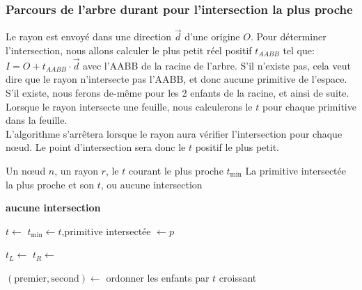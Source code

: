 \subsubsection{Parcours de l'arbre durant pour l'intersection la plus proche}

Le rayon est envoyé dans une direction $\vec{d}$ d'une origine $O$. Pour déterminer l'intersection, nous allons calculer le plus petit réel positif $t_{AABB}$ tel que: $I=O+t_{AABB}\cdot \vec d$ avec l'AABB de la racine de l'arbre. S'il n'existe pas, cela veut dire que le rayon n'intersecte pas l'AABB, et donc aucune primitive de l'espace. S'il existe, nous ferons de-même pour les 2 enfants de la racine, et ainsi de suite. Lorsque le rayon intersecte une feuille, nous calculerons le $t$ pour chaque primitive dans la feuille.\\

L'algorithme s'arrêtera lorsque le rayon aura vérifier l'intersection pour chaque n\oe ud. Le point d'intersection sera donc le $t$ positif le plus petit.\\

\begin{algorithm}
\caption{Intersection d'un rayon avec l'arbre BVH}
\begin{algorithmic}
\Require Un nœud $n$, un rayon $r$, le $t$ courant le plus proche $t_{\min}$
\Ensure La primitive intersectée la plus proche et son $t$, ou aucune intersection

    \State \Return \textbf{aucune intersection}
\EndIf

        \State $t \leftarrow$ 
            \State $t_{\min} \leftarrow t$,\quad primitive intersectée $\leftarrow p$
        \EndIf
    \EndFor
    \State \Return
\EndIf

\State $t_L \leftarrow$ 
\State $t_R \leftarrow$ 

\State $(\text{premier}, \text{second}) \leftarrow$ ordonner les enfants par $t$ croissant

    \State {}
\EndIf
{}
    \State {}
\EndIf
\end{algorithmic}
\end{algorithm}

